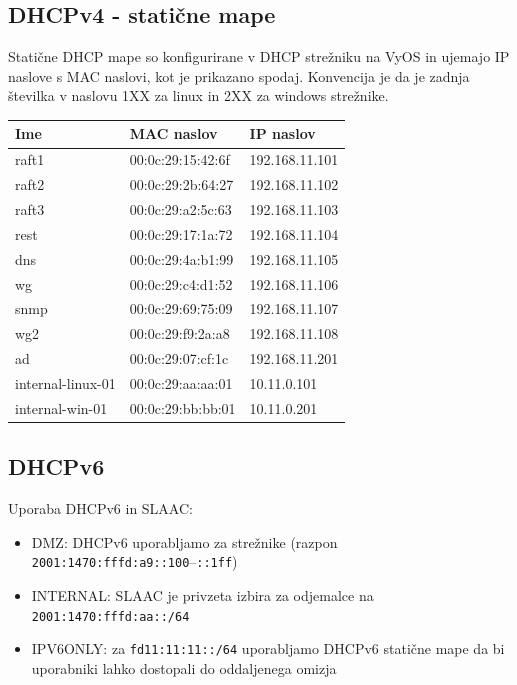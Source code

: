 \documentclass[a4paper,11pt]{article}
\begin{document}
\subsection{DHCPv4 - statične mape}
Statične DHCP mape so konfigurirane v DHCP strežniku na VyOS in ujemajo IP naslove s MAC naslovi, kot je prikazano spodaj.
Konvencija je da je zadnja številka v naslovu 1XX za linux in 2XX za windows strežnike.
\begin{longtable}{|l|l|l|}
\hline
\textbf{Ime} & \textbf{MAC naslov} & \textbf{IP naslov} \\
\hline
raft1 & 00:0c:29:15:42:6f & 192.168.11.101 \\
\hline
raft2 & 00:0c:29:2b:64:27 & 192.168.11.102 \\
\hline
raft3 & 00:0c:29:a2:5c:63 & 192.168.11.103 \\
\hline
rest & 00:0c:29:17:1a:72 & 192.168.11.104 \\
\hline
dns & 00:0c:29:4a:b1:99 & 192.168.11.105 \\
\hline
wg & 00:0c:29:c4:d1:52 & 192.168.11.106 \\
\hline
snmp & 00:0c:29:69:75:09 & 192.168.11.107 \\
\hline
wg2 & 00:0c:29:f9:2a:a8 & 192.168.11.108 \\
\hline
ad & 00:0c:29:07:cf:1c & 192.168.11.201 \\
\hline
internal-linux-01 & 00:0c:29:aa:aa:01 & 10.11.0.101 \\
\hline
internal-win-01 & 00:0c:29:bb:bb:01 & 10.11.0.201 \\
\hline
\end{longtable}

\subsection{DHCPv6}
Uporaba DHCPv6 in SLAAC:
\begin{itemize}
  \item DMZ: DHCPv6 uporabljamo za strežnike (razpon \texttt{2001:1470:fffd:a9::100}--\texttt{::1ff})
  \item INTERNAL: SLAAC je privzeta izbira za odjemalce na \texttt{2001:1470:fffd:aa::/64}
  \item IPV6ONLY: za \texttt{fd11:11:11::/64} uporabljamo DHCPv6 statične mape da bi uporabniki lahko dostopali do oddaljenega omizja
\end{itemize}
\end{document}
